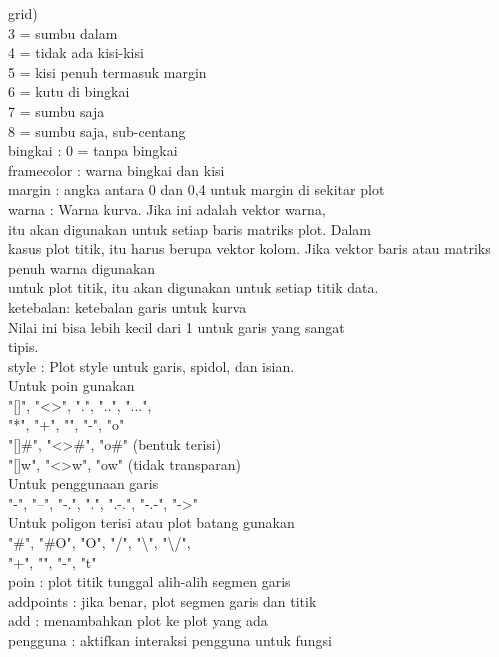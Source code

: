 \documentclass[a4paper,10pt]{article}
\begin{document}
\begin{eulernotebook}
\begin{eulercomment}
\begin{eulercomment}
\begin{eulercomment}
\begin{eulercomment}
\begin{eulercomment}
\begin{eulercomment}
\begin{eulercomment}
\begin{eulercomment}
\begin{eulercomment}
\begin{eulercomment}
\begin{eulercomment}
grid)\\
3 = sumbu dalam\\
4 = tidak ada kisi-kisi\\
5 = kisi penuh termasuk margin\\
6 = kutu di bingkai\\
7 = sumbu saja\\
8 = sumbu saja, sub-centang\\
bingkai : 0 = tanpa bingkai\\
framecolor : warna bingkai dan kisi\\
margin : angka antara 0 dan 0,4 untuk margin di sekitar plot\\
warna : Warna kurva. Jika ini adalah vektor warna,\\
itu akan digunakan untuk setiap baris matriks plot. Dalam\\
kasus plot titik, itu harus berupa vektor kolom. Jika vektor baris
atau matriks penuh warna digunakan\\
untuk plot titik, itu akan digunakan untuk setiap titik data.\\
ketebalan: ketebalan garis untuk kurva\\
Nilai ini bisa lebih kecil dari 1 untuk garis yang sangat\\
tipis.\\
style : Plot style untuk garis, spidol, dan isian.\\
Untuk poin gunakan\\
"[]", "\textless{}\textgreater{}", ".", "..", "...",\\
"*", "+", "\textbar{}", "-", "o"\\
"[]#", "\textless{}\textgreater{}#", "o#" (bentuk terisi)\\
"[]w", "\textless{}\textgreater{}w", "ow" (tidak transparan)\\
Untuk penggunaan garis\\
"-", "--", "-.", ".", ".-.", "-.-", "-\textgreater{}"\\
Untuk poligon terisi atau plot batang gunakan\\
"#", "#O", "O", "/", "\textbackslash{}", "\textbackslash{}/",\\
"+", "\textbar{}", "-", "t"\\
poin : plot titik tunggal alih-alih segmen garis\\
addpoints : jika benar, plot segmen garis dan titik\\
add : menambahkan plot ke plot yang ada\\
pengguna : aktifkan interaksi pengguna untuk fungsi\\

\end{eulercomment}
\end{eulercomment}
\end{eulercomment}
\end{eulercomment}
\end{eulercomment}
\end{eulercomment}
\end{eulercomment}
\end{eulercomment}
\end{eulercomment}
\end{eulercomment}
\end{eulercomment}
\end{eulernotebook}
\end{document}
